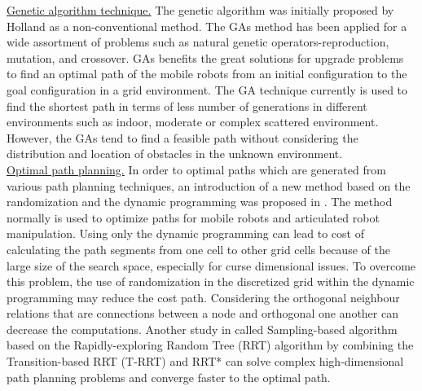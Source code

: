 \noindent\uline{Genetic algorithm technique.} The genetic algorithm was initially proposed by Holland \cite{Holland75_GAMethod} as a non-conventional method. The GAs method has been applied for a wide assortment of problems such as natural genetic operators-reproduction, mutation, and crossover. GAs benefits the great solutions for upgrade problems to find an optimal path of the mobile robots from an initial configuration to the goal configuration in a grid environment. The GA technique currently is used to find the shortest path in terms of less number of generations in different environments such as indoor, moderate or complex scattered environment. However, the GAs tend to find a feasible path without considering the distribution and location of obstacles in the unknown environment.\\





\noindent\uline{Optimal path planning.}
In order to optimal paths which are generated from various path planning techniques, an introduction of a new method based on the randomization and the dynamic programming was proposed in \cite{Sallaberger95_OptimalPP_DP_Randomization}.
The method normally is used to optimize paths for mobile robots and articulated robot manipulation. Using only the dynamic programming can lead to cost of calculating the path segments from one cell to other grid cells because of the large size of the search space, especially for curse dimensional issues. To overcome this problem, the use of randomization in the discretized grid within the dynamic programming may reduce the cost path. Considering the orthogonal neighbour relations that are connections between a node and orthogonal one another can decrease the computations. 
Another study in \cite{Devarus16_Optimal_PathPlanning} called Sampling-based algorithm based on the Rapidly-exploring Random Tree (RRT) algorithm by combining the Transition-based RRT (T-RRT) and RRT* can solve complex high-dimensional path planning problems and converge faster to the optimal path. \\ 

